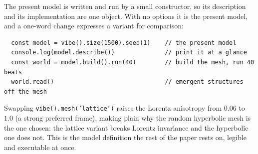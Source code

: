 The present model is written and run by a small constructor, so its description and
its implementation are one object. With no options it is the present model, and a
one-word change expresses a variant for comparison:
\begin{verbatim}
  const model = vibe().size(1500).seed(1)    // the present model
  console.log(model.describe())              // print it at a glance
  const world = model.build().run(40)        // build the mesh, run 40 beats
  world.read()                               // emergent structures off the mesh
\end{verbatim}
Swapping \texttt{vibe().mesh('lattice')} raises the Lorentz anisotropy from $0.06$ to
$1.0$ (a strong preferred frame), making plain why the random hyperbolic mesh is the
one chosen: the lattice variant breaks Lorentz invariance and the hyperbolic one
does not. This is the model definition the rest of the paper rests on, legible and
executable at once.
